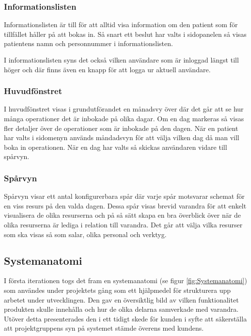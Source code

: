 \subsubsection{Informationslisten}
Informationslisten är till för att alltid visa information om den patient som för tillfället håller på att bokas in. Så snart ett beslut har valts i sidopanelen så visas patientens namn och personnummer i informationslisten.

I informationslisten syns det också vilken användare som är inloggad längst till höger och där finns även en knapp för att logga ur aktuell användare.

\subsubsection{Huvudfönstret}
I huvudfönstret visas i grundutförandet en månadsvy över där det går att se hur många operationer det är inbokade på olika dagar. Om en dag markeras så visas fler detaljer över de operationer som är inbokade på den dagen. När en patient har valts i sidomenyn används måndadsvyn för att välja vilken dag då man vill boka in operationen. När en dag har valts så skickas användaren vidare till spårvyn.

\subsubsection{Spårvyn}
Spårvyn visar ett antal konfigurerbara spår där varje spår motsvarar schemat för en viss resurs på den valda dagen. Dessa spår visas brevid varandra för att enkelt visualisera de olika resurserna och på så sätt skapa en bra överblick över när de olika resurserna är lediga i relation till varandra. Det går att välja vilka resurser som ska visas så som salar, olika personal och verktyg. 

\subsection{Systemanatomi}
I första iterationen togs det fram en systemanatomi (se figur \ref{fig:Systemanatomi}) som användes under projektets gång som ett hjälpmedel för strukturera upp arbetet under utvecklingen. Den gav en översiktlig bild av vilken funktionalitet produkten skulle innehålla och hur de olika delarna samverkade med varandra. Utöver detta presenterades den i ett tidigt skede för kunden i syfte att säkerställa att projektgruppens syn på systemet stämde överens med kundens.

